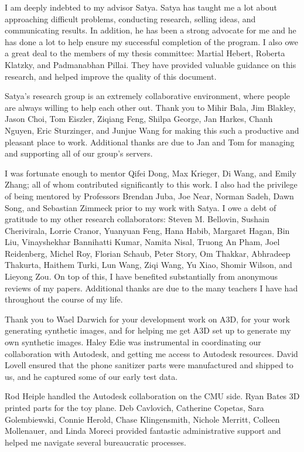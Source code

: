 \documentclass[12pt]{cmuthesis}
\begin{document}
\begin{acknowledgments}
  I am deeply indebted to my advisor Satya.
  Satya has taught me a lot about approaching difficult problems, conducting
  research, selling ideas, and communicating results.
  In addition, he has been a strong advocate for me and he has done a lot to
  help ensure my successful completion of the program.
  I also owe a great deal to the members of my thesis committee: Martial Hebert,
  Roberta Klatzky, and Padmanabhan Pillai.
  They have provided valuable guidance on this research, and helped improve the
  quality of this document.

  Satya's research group is an extremely collaborative environment, where
  people are always willing to help each other out.
  Thank you to Mihir Bala, Jim Blakley, Jason Choi, Tom Eiszler, Ziqiang Feng,
  Shilpa George, Jan Harkes, Chanh Nguyen, Eric Sturzinger, and Junjue Wang
  for making this such a productive and pleasant place to work.
  Additional thanks are due to Jan and Tom for managing and supporting all of
  our group's servers.

  I was fortunate enough to mentor Qifei Dong, Max Krieger, Di Wang, and Emily
  Zhang; all of whom contributed significantly to this work.
  I also had the privilege of being mentored by Professors Brendan Juba,
  Joe Near, Norman Sadeh, Dawn Song, and Sebastian Zimmeck prior to my work with
  Satya.
  I owe a debt of gratitude to my other research collaborators:
  Steven M. Bellovin, Sushain Cherivirala, Lorrie Cranor, Yuanyuan Feng, Hana
  Habib, Margaret Hagan, Bin Liu, Vinayshekhar Bannihatti Kumar, Namita Nisal,
  Truong An Pham, Joel Reidenberg, Michel Roy, Florian Schaub, Peter Story,
  Om Thakkar, Abhradeep Thakurta, Haithem Turki, Lun Wang, Ziqi Wang, Yu Xiao,
  Shomir Wilson, and Lieyong Zou.
  On top of this, I have benefited substantially from anonymous reviews of my
  papers.
  Additional thanks are due to the many teachers I have had throughout the
  course of my life.

  Thank you to Wael Darwich for your development work on A3D, for your work
  generating synthetic images, and for helping me get A3D set up to generate my
  own synthetic images.
  Haley Edie was instrumental in coordinating our collaboration with Autodesk,
  and getting me access to Autodesk resources.
  David Lovell ensured that the phone sanitizer parts were manufactured and
  shipped to us, and he captured some of our early test data.

  Rod Heiple handled the Autodesk collaboration on the CMU side.
  Ryan Bates 3D printed parts for the toy plane.
  Deb Cavlovich, Catherine Copetas, Sara Golembiewski, Connie Herold,
  Chase Klingensmith, Nichole Merritt, Colleen Mollenauer, and Linda Moreci
  provided fantastic administrative support and helped me navigate several
  bureaucratic processes.


\end{acknowledgments}
\end{document}
